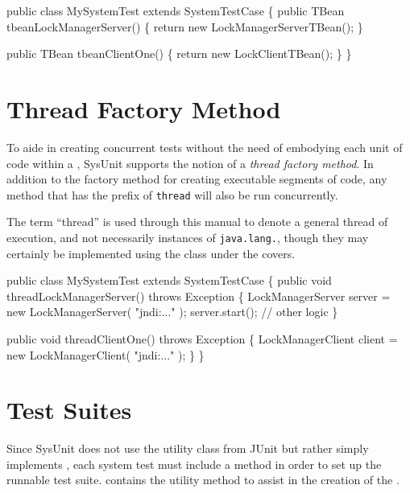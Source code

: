 \begin{codelisting}
public class MySystemTest
  extends SystemTestCase
\{
    public TBean tbeanLockManagerServer()
    \{
        return new LockManagerServerTBean();
    \}

    public TBean tbeanClientOne()
    \{
        return new LockClientTBean();
    \}
\}
\end{codelisting}

\section{Thread Factory Method}

To aide in creating concurrent tests without the need of
embodying each unit of code within a , SysUnit
supports the notion of a \emph{thread factory method}.
In addition to the  factory method for creating executable
segments of code, any method that has the prefix of \texttt{thread}
will also be run concurrently.

\begin{note}
The term ``thread'' is used through this manual to denote a
general thread of execution, and not necessarily instances of
\texttt{java.lang.}, though they may certainly be
implemented using the  class under the covers.
\end{note}

\begin{codelisting}
public class MySystemTest
  extends SystemTestCase
\{
    public void threadLockManagerServer()
        throws Exception
    \{
        LockManagerServer server = new LockManagerServer( "jndi:..." );
        server.start();
        // other logic
    \}

    public void threadClientOne()
        throws Exception
    \{
        LockManagerClient client = new LockManagerClient( "jndi:..." );
    \}
\}
\end{codelisting}

\section{Test Suites}

Since SysUnit does not use the  utility class
from JUnit but rather simply implements , each system
test must include a  method in order
to set up the runnable test suite.   contains
the  utility
method to assist in the creation of the .


